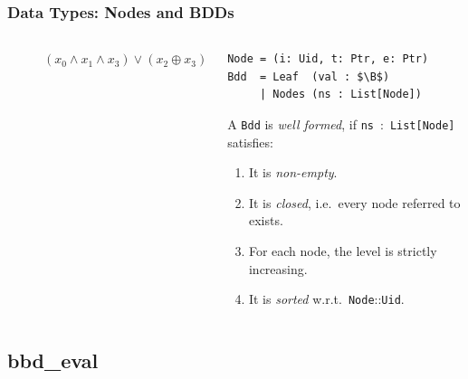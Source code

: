 \documentclass[english, aspectratio=169]{beamer}
\newcommand{\B}[0]{\ensuremath{\mathbb{B}}}
\begin{document}
\begin{frame} %
  \frametitle{Data Types: Nodes and BDDs}

  \begin{columns}
    \begin{column}[t]{0.4\linewidth}
      \begin{figure}
        \centering

        \begin{tikzpicture}[every node/.style={transform shape}]
          
        \end{tikzpicture}

        \caption{$(x_0 \wedge x_1 \wedge x_3) \vee (x_2 \oplus x_3)$}
      \end{figure}
    \end{column}
    \begin{column}[t]{0.6\linewidth}
      \begin{lstlisting}
Node = (i: Uid, t: Ptr, e: Ptr)
Bdd  = Leaf  (val : $\B$)
     | Nodes (ns : List[Node])
      \end{lstlisting}

      \begin{definition}
        A \texttt{Bdd} is \emph{well formed}, if \texttt{ns}~:~\texttt{List[Node]} satisfies:
        \begin{enumerate}
        \item It is \emph{non-empty}.
        \item It is \emph{closed}, i.e.\ every node referred to exists.
        \item For each node, the level is strictly increasing.
        \item It is \emph{sorted} w.r.t.\ \texttt{Node}::\texttt{Uid}.
        \end{enumerate}
      \end{definition}
    \end{column}
  \end{columns}
\end{frame}

\subsection{bbd\_eval}
\end{document}
